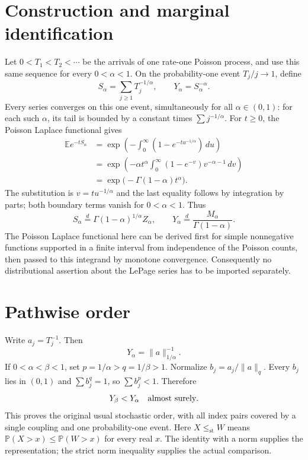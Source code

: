 \documentclass[11pt,a4paper]{article}
\begin{document}
\section{Construction and marginal identification}\label{sec:construction}
Let $0<T_1<T_2<\cdots$ be the arrivals of one rate-one Poisson process,
and use this same sequence for every $0<\alpha<1$. On the probability-one
event $T_j/j\to1$, define
\[
 S_\alpha=\sum_{j\geq1}T_j^{-1/\alpha},\qquad
 Y_\alpha=S_\alpha^{-\alpha}.
\]
Every series converges on this one event, simultaneously for all
$\alpha\in(0,1)$: for each such $\alpha$, its tail is bounded by a
constant times $\sum j^{-1/\alpha}$.
For $t\geq0$, the Poisson Laplace functional gives
\begin{align*}
 \mathbb E e^{-tS_\alpha}
 &=\exp\left(-\int_0^\infty(1-e^{-t u^{-1/\alpha}})\,du\right)\\
 &=\exp\left(-\alpha t^\alpha
        \int_0^\infty(1-e^{-v})v^{-\alpha-1}\,dv\right)\\
 &=\exp\bigl(-\Gamma(1-\alpha)t^\alpha\bigr).
\end{align*}
The substitution is $v=t u^{-1/\alpha}$ and the last equality follows
by integration by parts; both boundary terms vanish for $0<\alpha<1$.
Thus
\[
 S_\alpha\stackrel d=\Gamma(1-\alpha)^{1/\alpha}Z_\alpha,
 \qquad
 Y_\alpha\stackrel d=\frac{M_\alpha}{\Gamma(1-\alpha)}.
\]
The Poisson Laplace functional here can be derived first for simple
nonnegative functions supported in a finite interval from independence
of the Poisson counts, then passed to this integrand by monotone
convergence. Consequently no distributional assertion about the
LePage series has to be imported separately.

\section{Pathwise order}
Write $a_j=T_j^{-1}$. Then
\[
 Y_\alpha=\|a\|_{1/\alpha}^{-1}.
\]
If $0<\alpha<\beta<1$, set $p=1/\alpha>q=1/\beta>1$.
Normalize $b_j=a_j/\|a\|_q$. Every $b_j$ lies in $(0,1)$ and
$\sum b_j^q=1$, so $\sum b_j^p<1$. Therefore
\[
       Y_\beta<Y_\alpha\quad\hbox{almost surely}.
\]
This proves the original usual stochastic order, with all index pairs
covered by a single coupling and one probability-one event.
Here \(X\leq_{\mathrm{st}}W\) means
\(\mathbb P(X>x)\leq\mathbb P(W>x)\) for every real \(x\).
The identity with a norm supplies the representation; the strict norm
inequality supplies the actual comparison.
\end{document}
